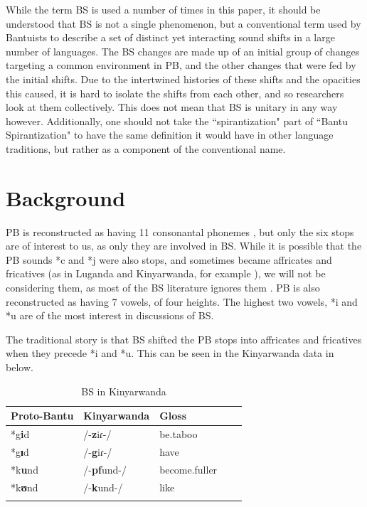 \documentclass[output=paper,colorlinks,citecolor=brown
]{langscibook}
\begin{document}
While the term BS is used a number of times in this paper, it should be understood that BS is not a single phenomenon, but a conventional term used by Bantuists to describe a set of distinct yet interacting sound shifts in a large number of languages. The BS changes are made up of an initial group of changes targeting a common environment in PB, and the other changes that were fed by the initial shifts. Due to the intertwined histories of these shifts and the opacities this caused, it is hard to isolate the shifts from each other, and so researchers look at them collectively. This does not mean that BS is unitary in any way however. Additionally, one should not take the “spirantization" part of “Bantu Spirantization" to have the same definition it would have in other language traditions, but rather as a component of the conventional name.

\section{Background}

PB is reconstructed as having 11 consonantal phonemes \citep{bastin2002}, but only the six stops are of interest to us, as only they are involved in BS. While it is possible that the PB sounds *c and *j were also stops, and sometimes became affricates and fricatives (as in Luganda and Kinyarwanda, for example \citealt{katamba1974,kieffer2021}), we will not be considering them, as most of the BS literature ignores them \citep{Janson2007,bostoen2008,labroussi2000}. PB is also reconstructed as having 7 vowels, of four heights. The highest two vowels, *i and *u are of the most interest in discussions of BS.

The traditional story is that BS shifted the PB stops into affricates and fricatives when they precede *i and *u. This can be seen in the Kinyarwanda data in  below.

\begin{table}
\caption{BS in Kinyarwanda
\citep{bastin2002,kieffer2021,Kinyarwanda}
}
\label{tab:kieffer:Rwanda}
 \begin{tabular}{lllll}
  \lsptoprule
           Proto-Bantu & Kinyarwanda & Gloss\\
  \midrule
  *g\textbf{i}d  &   /-\textbf{z}iɾ-/ & be.taboo\\
    *g\textbf{ɪ}d  &   /-\textbf{g}iɾ-/ & have\\
 *k\textbf{u}nd  &   /-\textbf{pf}und-/ & become.fuller\\
  *k\textbf{ʊ}nd  &   /-\textbf{k}und-/ & like\\
 
  \lspbottomrule
 \end{tabular}
\end{table}
\end{document}
